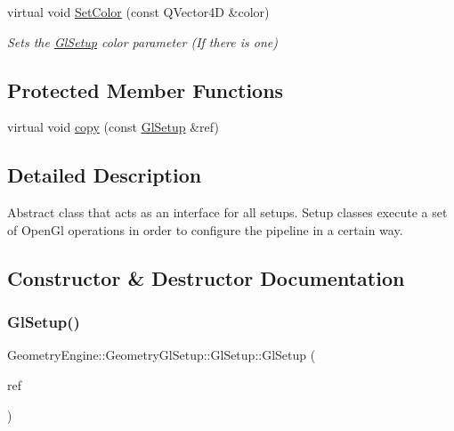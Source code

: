\begin{DoxyCompactItemize}
\item 
\mbox{\label{class_geometry_engine_1_1_geometry_gl_setup_1_1_gl_setup_acd5b3b2525d11f103f1d3cf298d4af94}} 
virtual void \mbox{\hyperlink{class_geometry_engine_1_1_geometry_gl_setup_1_1_gl_setup_acd5b3b2525d11f103f1d3cf298d4af94}{Set\+Color}} (const Q\+Vector4D \&color)
\begin{DoxyCompactList}\small\item\em Sets the \mbox{\hyperlink{class_geometry_engine_1_1_geometry_gl_setup_1_1_gl_setup}{Gl\+Setup}} color parameter (If there is one) \end{DoxyCompactList}\end{DoxyCompactItemize}
\subsection*{Protected Member Functions}
\begin{DoxyCompactItemize}
\item 
virtual void \mbox{\hyperlink{class_geometry_engine_1_1_geometry_gl_setup_1_1_gl_setup_a97e569658af28d7d60a3be95fa8cb0af}{copy}} (const \mbox{\hyperlink{class_geometry_engine_1_1_geometry_gl_setup_1_1_gl_setup}{Gl\+Setup}} \&ref)
\end{DoxyCompactItemize}


\subsection{Detailed Description}
Abstract class that acts as an interface for all setups. Setup classes execute a set of Open\+Gl operations in order to configure the pipeline in a certain way. 

\subsection{Constructor \& Destructor Documentation}
\mbox{\label{class_geometry_engine_1_1_geometry_gl_setup_1_1_gl_setup_a2aeb6f3e7475c4021597de2fb0bd9060}} 
\subsubsection{\texorpdfstring{GlSetup()}{GlSetup()}}
{\footnotesize\ttfamily Geometry\+Engine\+::\+Geometry\+Gl\+Setup\+::\+Gl\+Setup\+::\+Gl\+Setup (\begin{DoxyParamCaption}\item[{const \mbox{\hyperlink{class_geometry_engine_1_1_geometry_gl_setup_1_1_gl_setup}{Gl\+Setup}} \&}]{ref }\end{DoxyParamCaption})\hspace{0.3cm}{\ttfamily [inline]}}

